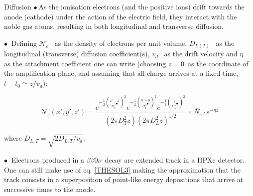 \documentclass [aspectratio=169]{beamer}
\newcommand{\bbonu}{\ensuremath{\beta\beta0\nu}}
\begin{document}
\begin{frame}{Diffusion}
$\bullet~$As the ionisation electrons (and the positive ions) drift towards the anode (cathode) under the action of the electric field, they interact with the noble gas atoms, resulting in both longitudinal and transverse diffusion.

$\bullet~$ Defining
$\mathcal{N}_e$~ as the density of electrons per unit volume, $D_{L(T)}$~ as the longitudinal (transverse) diffusion coefficient(s), $v_d$~ as the drift velocity and $\eta$~ as the attachment coefficient one can write (choosing $z = 0$~as the coordinate of the amplification plane, and assuming that all charge arrives at a fixed time, $t - t_0 \simeq z/v_d$):

\begin{equation}
\mathcal{N}_e(x',y',z') =  \frac{e^{-\frac{1}{2}(\frac{x'-x}{D_T^{\sqrt{z}}})^2} e^{-\frac{1}{2}(\frac{y'-y}{D_T^{\sqrt{z}}})^2} e^{-\frac{1}{2}(\frac{z'}{D_L^{\sqrt{z}}})^2}}{(2\pi D_T^{2} z)(2\pi D_L^{2} z)^{1/2}}\times 
\bar{N}_e \cdot e^{-\eta z} \label{THESOL3}
\end{equation}

%
where $D_{L,T} = \sqrt{2D_{L,T}/v_d}$. 

$\bullet~$ Electrons produced in a \bbonu\ decay are extended track in a HPXe detector. One can still make use of  eq. \ref{THESOL3} making the approximation that the track consists in a superposition of point-like energy depositions that arrive at successive times to the anode.

\end{frame}
\end{document}
